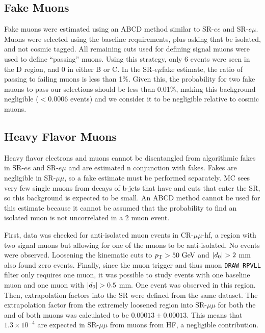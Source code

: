 \subsection{Fake Muons}
Fake muons were estimated using an ABCD method similar to SR-$ee$ and SR-$e\mu$. Muons were selected using the baseline requirements, plus asking that be isolated, and not cosmic tagged. All remaining cuts used for defining signal muons were used to define ``passing'' muons. Using this strategy, only 6 events were seen in the D region, and 0 in either B or C. In the SR-$e\mu $fake estimate, the ratio of passing to failing muons is less than 1\%. Given this, the probability for two fake muons to pass our selections should be less than 0.01\%, making this background negligible ($<0.0006$ events) and we consider it to be negligible relative to cosmic muons.

\subsection{Heavy Flavor Muons}

Heavy flavor electrons and muons cannot be disentangled from algorithmic fakes in SR-$ee$ and SR-$e\mu$ and are estimated n conjunction with fakes. Fakes are negligible in SR-$\mu\mu$, so a fake estimate must be performed separately. \ttbar \ac{MC} sees very few single muons from decays of b-jets that have \pt and \absdz cuts that enter the \ac{SR}, so this background is expected to be small. An ABCD method cannot be used for this estimate because it cannot be assumed that the probability to find an isolated muon is not uncorrelated in a 2 muon event.

First, data was checked for anti-isolated muon events in CR-$\mu\mu$-hf, a region with two signal muons but allowing for one of the muons to be anti-isolated. No events were observed. Loosening the kinematic cuts to $\pt > 50 \GeV$ and $|d_0| > 2$ mm also found zero events. Finally, since the muon trigger and thus muon \texttt{DRAW\_RPVLL} filter only requires one muon, it was possible to study events with one baseline muon and one muon with $|d_0| > 0.5$ mm. One event was observed in this region. Then, extrapolation factors into the \ac{SR} were defined from the same dataset. The extrapolation factor  from the extremely loosened region into SR-$\mu\mu$ for both the \absdz and \pt of both muons was calculated to be $0.00013 \pm 0.00013$. This means that $1.3 \times 10^{-4}$ are expected in SR-$\mu\mu$ from muons from \ac{HF}, a negligible contribution.


